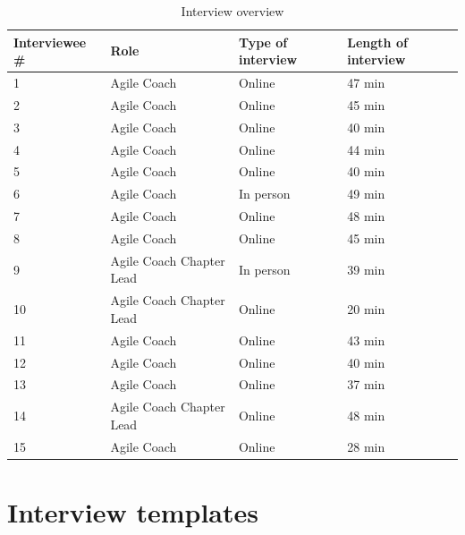 \documentclass[11pt,a4paper]{report}
\begin{document}
\begin{table}[!ht]
    \centering
    \begin{tabular}{|l|l|l|l|}
    \hline
         \textbf{Interviewee \#} & \textbf{Role} & \textbf{Type of interview} & \textbf{Length of interview} \\ \hline
          1 & Agile Coach & Online & 47 min   \\ \hline
          2 & Agile Coach & Online & 45 min \\ \hline
          3 & Agile Coach & Online & 40 min \\ \hline
          4 & Agile Coach & Online & 44 min \\ \hline
          5 & Agile Coach & Online & 40 min \\ \hline
          6 & Agile Coach & In person & 49 min \\ \hline
          7 & Agile Coach & Online & 48 min \\ \hline
          8 & Agile Coach & Online & 45 min \\ \hline
          9 & Agile Coach Chapter Lead & In person & 39 min \\ \hline
          10 & Agile Coach Chapter Lead & Online & 20 min \\ \hline
          11 & Agile Coach & Online & 43 min \\ \hline
          12 & Agile Coach & Online & 40 min \\ \hline
          13 & Agile Coach & Online & 37 min \\ \hline
          14 & Agile Coach Chapter Lead & Online & 48 min \\ \hline
          15 & Agile Coach & Online & 28 min \\ \hline
    \end{tabular}
    \caption{Interview overview}
    \label{interviewOverview}
\end{table}
\newpage
\chapter{Interview templates}
\label{Interview templates}
\end{document}
